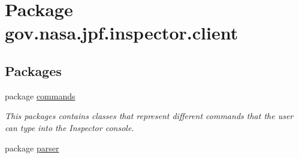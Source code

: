 \hypertarget{namespacegov_1_1nasa_1_1jpf_1_1inspector_1_1client}{}\section{Package gov.\+nasa.\+jpf.\+inspector.\+client}
\label{namespacegov_1_1nasa_1_1jpf_1_1inspector_1_1client}
\subsection*{Packages}
\begin{DoxyCompactItemize}
\item 
package \hyperlink{namespacegov_1_1nasa_1_1jpf_1_1inspector_1_1client_1_1commands}{commands}
\begin{DoxyCompactList}\small\item\em This packages contains classes that represent different commands that the user can type into the Inspector console. \end{DoxyCompactList}\item 
package \hyperlink{namespacegov_1_1nasa_1_1jpf_1_1inspector_1_1client_1_1parser}{parser}
\end{DoxyCompactItemize}
